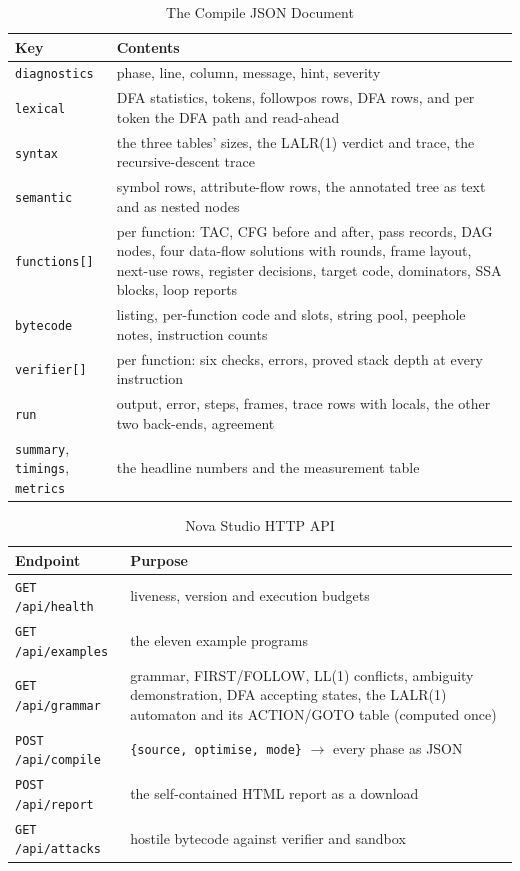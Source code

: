 \documentclass[conference]{IEEEtran}
\newcommand{\code}[1]{\texttt{#1}}
\begin{document}
\begin{table}[!tbp]
\caption{The Compile JSON Document}
\label{tab:json}
\centering
\footnotesize
\setlength{\tabcolsep}{4pt}
\begin{tabular}{@{}l L{5.1cm}@{}}
\toprule
Key & Contents \\
\midrule
\code{diagnostics} & phase, line, column, message, hint, severity \\
\code{lexical} & DFA statistics, tokens, followpos rows, DFA rows, and per token the DFA path and read-ahead \\
\code{syntax} & the three tables' sizes, the LALR(1) verdict and trace, the recursive-descent trace \\
\code{semantic} & symbol rows, attribute-flow rows, the annotated tree as text and as nested nodes \\
\code{functions[]} & per function: TAC, CFG before and after, pass records, DAG nodes, four data-flow solutions with rounds, frame layout, next-use rows, register decisions, target code, dominators, SSA blocks, loop reports \\
\code{bytecode} & listing, per-function code and slots, string pool, peephole notes, instruction counts \\
\code{verifier[]} & per function: six checks, errors, proved stack depth at every instruction \\
\code{run} & output, error, steps, frames, trace rows with locals, the other two back-ends, agreement \\
\makecell[l]{\code{summary}, \code{timings},\\ \code{metrics}} & the headline numbers and the measurement table \\
\bottomrule
\end{tabular}
\end{table}

\begin{table}[!tbp]
\caption{Nova Studio HTTP API}
\label{tab:api}
\centering
\footnotesize
\setlength{\tabcolsep}{4pt}
\begin{tabular}{@{}l L{4.85cm}@{}}
\toprule
Endpoint & Purpose \\
\midrule
\code{GET /api/health} & liveness, version and execution budgets \\
\code{GET /api/examples} & the eleven example programs \\
\code{GET /api/grammar} & grammar, FIRST/FOLLOW, LL(1) conflicts, ambiguity demonstration, DFA accepting states, the LALR(1) automaton and its ACTION/GOTO table (computed once) \\
\code{POST /api/compile} & \code{\{source, optimise, mode\}} $\to$ every phase as JSON \\
\code{POST /api/report} & the self-contained HTML report as a download \\
\code{GET /api/attacks} & hostile bytecode against verifier and sandbox \\
\bottomrule
\end{tabular}
\end{table}
\end{document}

